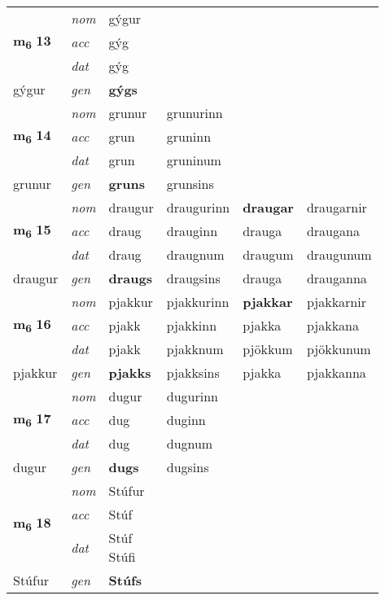 \begin{longtable}[l]{X>{\footnotesize\itshape}XXXXX}
\multirow{3}{*}{{{\textbf{m{\textsubscript{6}}} \Large{\textbf{13}}}}} & nom & gýgur &  & \textbf{} &  \\*
 & acc & gýg &  &  &  \\*
 & dat & gýg &  &  &  \\*
 {\footnotesize{gýgur}} & gen & \textbf{gýgs} &  &  &  \\
\midrule

\multirow{3}{*}{{{\textbf{m{\textsubscript{6}}} \Large{\textbf{14}}}}} & nom & grunur & grunurinn & \textbf{} &  \\*
 & acc & grun & gruninn &  &  \\*
 & dat & grun & gruninum &  &  \\*
 {\footnotesize{grunur}} & gen & \textbf{gruns} & grunsins &  &  \\
\midrule

\multirow{3}{*}{{{\textbf{m{\textsubscript{6}}} \Large{\textbf{15}}}}} & nom & draugur & draugurinn & \textbf{draugar} & draugarnir \\*
 & acc & draug & drauginn & drauga & draugana \\*
 & dat & draug & draugnum & draugum & draugunum \\*
 {\footnotesize{draugur}} & gen & \textbf{draugs} & draugsins & drauga & drauganna \\
\midrule

\multirow{3}{*}{{{\textbf{m{\textsubscript{6}}} \Large{\textbf{16}}}}} & nom & pjakkur & pjakkurinn & \textbf{pjakkar} & pjakkarnir \\*
 & acc & pjakk & pjakkinn & pjakka & pjakkana \\*
 & dat & pjakk & pjakknum & pjökkum & pjökkunum \\*
 {\footnotesize{pjakkur}} & gen & \textbf{pjakks} & pjakksins & pjakka & pjakkanna \\
\midrule

\multirow{3}{*}{{{\textbf{m{\textsubscript{6}}} \Large{\textbf{17}}}}} & nom & dugur & dugurinn & \textbf{} &  \\*
 & acc & dug & duginn &  &  \\*
 & dat & dug & dugnum &  &  \\*
 {\footnotesize{dugur}} & gen & \textbf{dugs} & dugsins &  &  \\
\midrule

\multirow{3}{*}{{{\textbf{m{\textsubscript{6}}} \Large{\textbf{18}}}}} & nom & Stúfur &  & \textbf{} &  \\*
 & acc & Stúf &  &  &  \\*
 & dat & \specialcell{Stúf\\ Stúfi} &  &  &  \\*
 {\footnotesize{Stúfur}} & gen & \textbf{Stúfs} &  &  &  \\
\midrule


\end{longtable}
